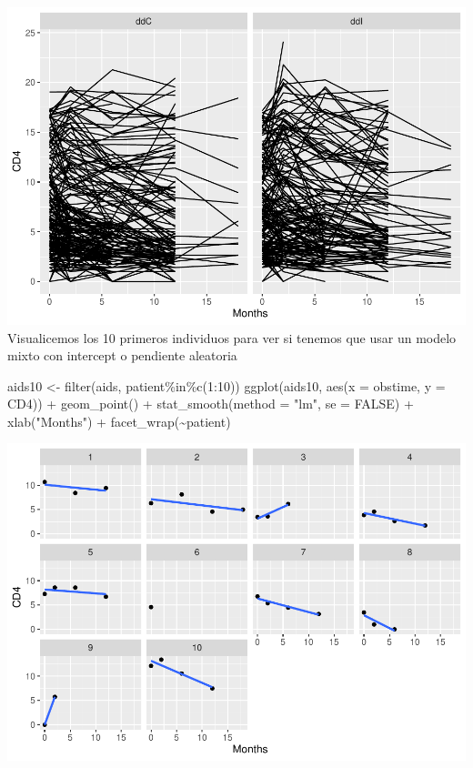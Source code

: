 \documentclass[
]{book}
\newenvironment{Shaded}{\begin{snugshade}}{\end{snugshade}}
\newcommand{\AttributeTok}[1]{\textcolor[rgb]{0.77,0.63,0.00}{#1}}
\newcommand{\ConstantTok}[1]{\textcolor[rgb]{0.00,0.00,0.00}{#1}}
\newcommand{\DecValTok}[1]{\textcolor[rgb]{0.00,0.00,0.81}{#1}}
\newcommand{\FunctionTok}[1]{\textcolor[rgb]{0.00,0.00,0.00}{#1}}
\newcommand{\NormalTok}[1]{#1}
\newcommand{\OtherTok}[1]{\textcolor[rgb]{0.56,0.35,0.01}{#1}}
\newcommand{\SpecialCharTok}[1]{\textcolor[rgb]{0.00,0.00,0.00}{#1}}
\newcommand{\StringTok}[1]{\textcolor[rgb]{0.31,0.60,0.02}{#1}}
\begin{document}
\includegraphics{fig_out/unnamed-chunk-170-1.pdf}
Visualicemos los 10 primeros individuos para ver si tenemos que usar un modelo mixto con intercept o pendiente aleatoria

\begin{Shaded}
\begin{Highlighting}[]
\NormalTok{aids10 }\OtherTok{\textless{}{-}} \FunctionTok{filter}\NormalTok{(aids, patient}\SpecialCharTok{\%in\%}\FunctionTok{c}\NormalTok{(}\DecValTok{1}\SpecialCharTok{:}\DecValTok{10}\NormalTok{))}
\FunctionTok{ggplot}\NormalTok{(aids10, }\FunctionTok{aes}\NormalTok{(}\AttributeTok{x =}\NormalTok{ obstime, }\AttributeTok{y =}\NormalTok{ CD4)) }\SpecialCharTok{+} 
  \FunctionTok{geom\_point}\NormalTok{() }\SpecialCharTok{+}  \FunctionTok{stat\_smooth}\NormalTok{(}\AttributeTok{method =} \StringTok{"lm"}\NormalTok{, }\AttributeTok{se =} \ConstantTok{FALSE}\NormalTok{) }\SpecialCharTok{+}
  \FunctionTok{xlab}\NormalTok{(}\StringTok{"Months"}\NormalTok{) }\SpecialCharTok{+} \FunctionTok{facet\_wrap}\NormalTok{(}\SpecialCharTok{\textasciitilde{}}\NormalTok{patient)}
\end{Highlighting}
\end{Shaded}

\includegraphics{fig_out/unnamed-chunk-171-1.pdf}
\end{document}
